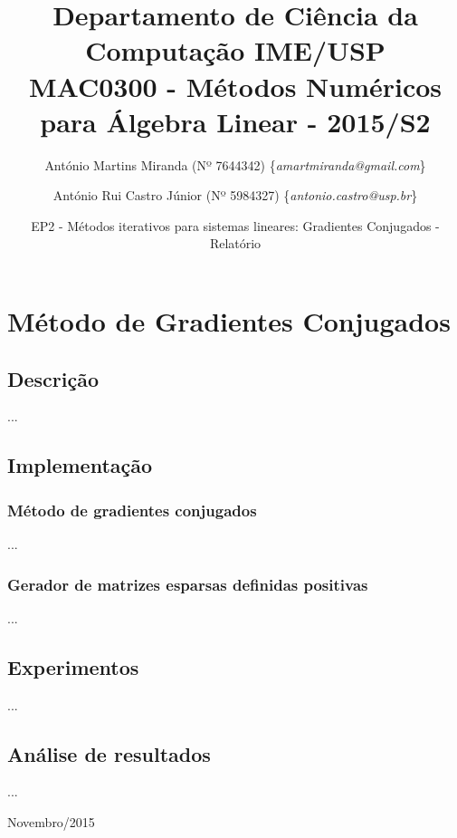 \documentclass[a4paper,11pt]{article}
\begin{document}
\lstset{language=C}
\small{
  \title{
    {\small
      Departamento de Ciência da Computação \hfill IME/USP}\\\vspace{0.1in}
    MAC0300 - Métodos Numéricos para Álgebra Linear - 2015/S2
  }
  \vspace{-0.6in}
  \author{
    António Martins Miranda (Nº 7644342) \{\textit{amartmiranda@gmail.com}\} \\
    \and
    António Rui Castro Júnior (Nº 5984327) \{\textit{antonio.castro@usp.br}\}
    \vspace{-0.6in}
  }
  \date{EP2 - Métodos iterativos para sistemas lineares: Gradientes Conjugados - Relatório}
  \maketitle
}
\vspace {-0.3in}
\thispagestyle{empty}

\setlength{\parindent}{5ex}

\section{Método de Gradientes Conjugados}
\subsection{Descrição}
...
\subsection{Implementação}
\subsubsection{Método de gradientes conjugados}
...
\subsubsection{Gerador de matrizes esparsas definidas positivas}
...
\subsection{Experimentos}
...
\subsection{Análise de resultados}
...

\vfill

\raggedleft
    {\sc Novembro/2015}
    
\end{document}

